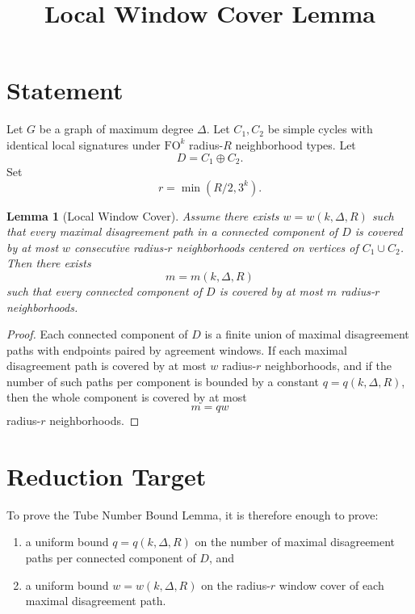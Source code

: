 \documentclass[11pt]{article}
\title{Local Window Cover Lemma}
\date{}
\newtheorem{lemma}{Lemma}
\begin{document}
\maketitle

\section*{Statement}

Let \(G\) be a graph of maximum degree \(\Delta\).  
Let \(C_1,C_2\) be simple cycles with identical local signatures under
\(\mathrm{FO}^k\) radius-\(R\) neighborhood types.  
Let
\[
D=C_1\oplus C_2 .
\]
Set
\[
r=\min(R/2,3^k).
\]

\begin{lemma}[Local Window Cover]
Assume there exists \(w=w(k,\Delta,R)\) such that every maximal disagreement path
in a connected component of \(D\) is covered by at most \(w\) consecutive
radius-\(r\) neighborhoods centered on vertices of \(C_1\cup C_2\).
Then there exists
\[
m=m(k,\Delta,R)
\]
such that every connected component of \(D\) is covered by at most \(m\)
radius-\(r\) neighborhoods.
\end{lemma}

\begin{proof}
Each connected component of \(D\) is a finite union of maximal disagreement
paths with endpoints paired by agreement windows. If each maximal disagreement
path is covered by at most \(w\) radius-\(r\) neighborhoods, and if the number
of such paths per component is bounded by a constant \(q=q(k,\Delta,R)\), then
the whole component is covered by at most
\[
m=qw
\]
radius-\(r\) neighborhoods.
\end{proof}

\section*{Reduction Target}

To prove the Tube Number Bound Lemma, it is therefore enough to prove:

\begin{enumerate}
\item a uniform bound \(q=q(k,\Delta,R)\) on the number of maximal disagreement
paths per connected component of \(D\), and
\item a uniform bound \(w=w(k,\Delta,R)\) on the radius-\(r\) window cover of
each maximal disagreement path.
\end{enumerate}
\end{document}
